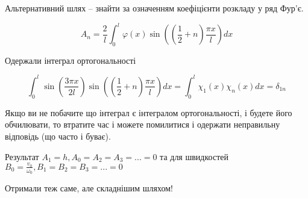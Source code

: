 Альтернативний шлях -- знайти за означенням коефіцієнти розкладу у ряд Фур'є.

\begin{equation}
A_n = \frac{2}{l} \int_{0}^{l} \varphi (x)  \sin \left( (\frac{1}{2} + n) \frac{\pi x}{l} \right) dx    
\end{equation}


Одержали інтеграл ортогональності 

\begin{equation}
    \int^{l}_0 \sin \left( \frac{3 \pi x}{2 l} \right) \sin \left( (\frac{1}{2} + n) \frac{\pi x}{l} \right) dx = \int^{l}_0 \chi_1 (x) \chi_n (x) dx = \delta_{1n}
\end{equation}

Якщо ви не побачите що інтеграл є інтегралом ортогональності, і будете його обчилювати, то втратите час і можете помилитися і одержати неправильну відповідь (що часто і буває).

Результат $A_1 = h, A_0 = A_2 = A_3 = ... = 0$ та для швидкостей $B_0 = \frac{v_0}{\omega_0}, B_1 = B_2 = B_3 = ... = 0$

Отримали теж саме, але складнішим шляхом!

%
